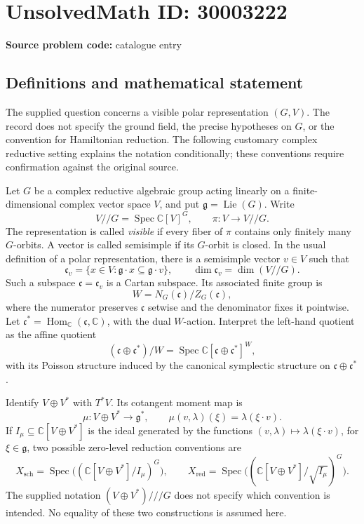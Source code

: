 \documentclass[11pt]{article}
\newcommand{\C}{\mathbb{C}}
\begin{document}
\section*{UnsolvedMath ID: 30003222}
\textbf{Source problem code:} catalogue entry
\subsection{Definitions and mathematical statement}
The supplied question concerns a visible polar representation \((G,V)\). The record does not specify the ground field, the precise hypotheses on \(G\), or the convention for Hamiltonian reduction. The following customary complex reductive setting explains the notation conditionally; these conventions require confirmation against the original source.

Let \(G\) be a complex reductive algebraic group acting linearly on a finite-dimensional complex vector space \(V\), and put \(\mathfrak g=\operatorname{Lie}(G)\). Write
\[
V/\!/G=\operatorname{Spec}\C[V]^G,
\qquad \pi:V\longrightarrow V/\!/G.
\]
The representation is called \emph{visible} if every fiber of \(\pi\) contains only finitely many \(G\)-orbits. A vector is called semisimple if its \(G\)-orbit is closed. In the usual definition of a polar representation, there is a semisimple vector \(v\in V\) such that
\[
\mathfrak c_v=\{x\in V:\mathfrak g\cdot x\subseteq\mathfrak g\cdot v\},
\qquad
\dim\mathfrak c_v=\dim(V/\!/G).
\]
Such a subspace \(\mathfrak c=\mathfrak c_v\) is a Cartan subspace. Its associated finite group is
\[
W=N_G(\mathfrak c)/Z_G(\mathfrak c),
\]
where the numerator preserves \(\mathfrak c\) setwise and the denominator fixes it pointwise. Let \(\mathfrak c^*=\operatorname{Hom}_{\C}(\mathfrak c,\C)\), with the dual \(W\)-action. Interpret the left-hand quotient as the affine quotient
\[
(\mathfrak c\oplus\mathfrak c^*)/W
=\operatorname{Spec}\C[\mathfrak c\oplus\mathfrak c^*]^W,
\]
with its Poisson structure induced by the canonical symplectic structure on \(\mathfrak c\oplus\mathfrak c^*\).

Identify \(V\oplus V^*\) with \(T^*V\). Its cotangent moment map is
\[
\mu:V\oplus V^*\longrightarrow\mathfrak g^*,
\qquad
\mu(v,\lambda)(\xi)=\lambda(\xi\cdot v).
\]
If \(I_\mu\subseteq\C[V\oplus V^*]\) is the ideal generated by the functions \((v,\lambda)\mapsto\lambda(\xi\cdot v)\), for \(\xi\in\mathfrak g\), two possible zero-level reduction conventions are
\[
X_{\mathrm{sch}}=\operatorname{Spec}\bigl((\C[V\oplus V^*]/I_\mu)^G\bigr),
\qquad
X_{\mathrm{red}}=\operatorname{Spec}\bigl((\C[V\oplus V^*]/\sqrt{I_\mu})^G\bigr).
\]
The supplied notation \((V\oplus V^*)\mathbin{///}G\) does not specify which convention is intended. No equality of these two constructions is assumed here.
\end{document}

